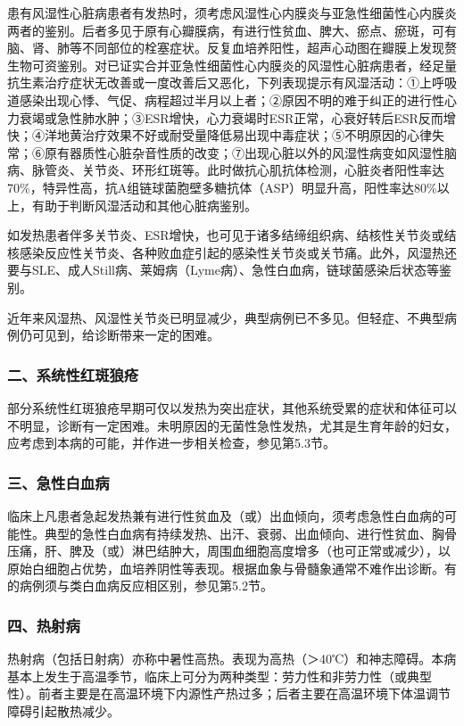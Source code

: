 患有风湿性心脏病患者有发热时，须考虑风湿性心内膜炎与亚急性细菌性心内膜炎两者的鉴别。后者多见于原有心瓣膜病，有进行性贫血、脾大、瘀点、瘀斑，可有脑、肾、肺等不同部位的栓塞症状。反复血培养阳性，超声心动图在瓣膜上发现赘生物可资鉴别。对已证实合并亚急性细菌性心内膜炎的风湿性心脏病患者，经足量抗生素治疗症状无改善或一度改善后又恶化，下列表现提示有风湿活动：①上呼吸道感染出现心悸、气促、病程超过半月以上者；②原因不明的难于纠正的进行性心力衰竭或急性肺水肿；③ESR增快，心力衰竭时ESR正常，心衰好转后ESR反而增快；④洋地黄治疗效果不好或耐受量降低易出现中毒症状；⑤不明原因的心律失常；⑥原有器质性心脏杂音性质的改变；⑦出现心脏以外的风湿性病变如风湿性脑病、脉管炎、关节炎、环形红斑等。此时做抗心肌抗体检测，心脏炎者阳性率达70\%，特异性高，抗A组链球菌胞壁多糖抗体（ASP）明显升高，阳性率达80\%以上，有助于判断风湿活动和其他心脏病鉴别。

如发热患者伴多关节炎、ESR增快，也可见于诸多结缔组织病、结核性关节炎或结核感染反应性关节炎、各种败血症引起的感染性关节炎或关节痛。此外，风湿热还要与SLE、成人Still病、莱姆病（Lyme病）、急性白血病，链球菌感染后状态等鉴别。

近年来风湿热、风湿性关节炎已明显减少，典型病例已不多见。但轻症、不典型病例仍可见到，给诊断带来一定的困难。

\subsubsection{二、系统性红斑狼疮}

部分系统性红斑狼疮早期可仅以发热为突出症状，其他系统受累的症状和体征可以不明显，诊断有一定困难。未明原因的无菌性急性发热，尤其是生育年龄的妇女，应考虑到本病的可能，并作进一步相关检查，参见第5.3节。

\subsubsection{三、急性白血病}

临床上凡患者急起发热兼有进行性贫血及（或）出血倾向，须考虑急性白血病的可能性。典型的急性白血病有持续发热、出汗、衰弱、出血倾向、进行性贫血、胸骨压痛，肝、脾及（或）淋巴结肿大，周围血细胞高度增多（也可正常或减少），以原始白细胞占优势，血培养阴性等表现。根据血象与骨髓象通常不难作出诊断。有的病例须与类白血病反应相区别，参见第5.2节。

\subsubsection{四、热射病}

热射病（包括日射病）亦称中暑性高热。表现为高热（＞40℃）和神志障碍。本病基本上发生于高温季节，临床上可分为两种类型：劳力性和非劳力性（或典型性）。前者主要是在高温环境下内源性产热过多；后者主要在高温环境下体温调节障碍引起散热减少。

